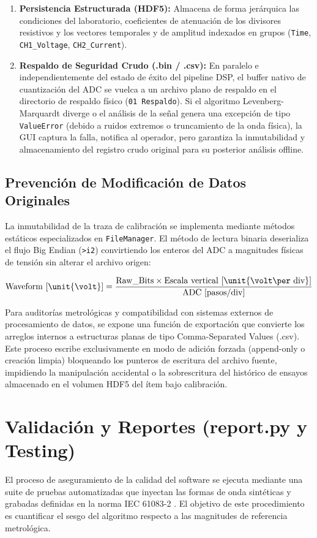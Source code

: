 \begin{enumerate}
    \item \textbf{Persistencia Estructurada (HDF5):} Almacena de forma jerárquica las condiciones del laboratorio, coeficientes de atenuación de los divisores resistivos y los vectores temporales y de amplitud indexados en grupos (\texttt{Time}, \texttt{CH1\_Voltage}, \texttt{CH2\_Current}).
    \item \textbf{Respaldo de Seguridad Crudo (.bin / .csv):} En paralelo e independientemente del estado de éxito del pipeline DSP, el buffer nativo de cuantización del ADC se vuelca a un archivo plano de respaldo en el directorio de respaldo físico (\texttt{01 Respaldo}). Si el algoritmo Levenberg-Marquardt diverge o el análisis de la señal genera una excepción de tipo \texttt{ValueError} (debido a ruidos extremos o truncamiento de la onda física), la GUI captura la falla, notifica al operador, pero garantiza la inmutabilidad y almacenamiento del registro crudo original para su posterior análisis offline.
\end{enumerate}

\subsection{Prevención de Modificación de Datos Originales}
La inmutabilidad de la traza de calibración se implementa mediante métodos estáticos especializados en \texttt{FileManager}. El método de lectura binaria deserializa el flujo Big Endian (\texttt{>i2}) convirtiendo los enteros del ADC a magnitudes físicas de tensión sin alterar el archivo origen:

\begin{equation}
    \text{Waveform [\unit{\volt}]} = \frac{\text{Raw\_Bits} \times \text{Escala vertical [\unit{\volt\per div}]}}{\text{ADC [\text{pasos}/div]}}
\end{equation}

Para auditorías metrológicas y compatibilidad con sistemas externos de procesamiento de datos, se expone una función de exportación que convierte los arreglos internos a estructuras planas de tipo Comma-Separated Values (.csv). Este proceso escribe exclusivamente en modo de adición forzada (append-only o creación limpia) bloqueando los punteros de escritura del archivo fuente, impidiendo la manipulación accidental o la sobrescritura del histórico de ensayos almacenado en el volumen HDF5 del ítem bajo calibración.

\section{Validación y Reportes (report.py y Testing)}
El proceso de aseguramiento de la calidad del software se ejecuta mediante una suite de pruebas automatizadas que inyectan las formas de onda sintéticas y grabadas definidas en la norma IEC 61083-2 \cite{iec61083_2}. El objetivo de este procedimiento es cuantificar el sesgo del algoritmo respecto a las magnitudes de referencia metrológica.


